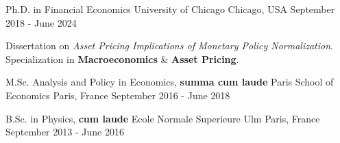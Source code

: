 

\begin{cventries}

	\cventry
	{Ph.D. in Financial Economics} %
	{University of Chicago} %
	{Chicago, USA} %
	{September 2018 - June 2024} %
	{\begin{cvitems}
			\item Dissertation on \textit{Asset Pricing Implications of Monetary Policy Normalization}. Specialization in \textbf{Macroeconomics} \& \textbf{Asset Pricing}.
		\end{cvitems}}

	\cventry
	{M.Sc. Analysis and Policy in Economics, \textbf{summa cum laude}} %
	{Paris School of Economics} %
	{Paris, France} %
	{September 2016 - June 2018} %
	{}

	\cventry
	{B.Sc. in Physics, \textbf{cum laude}} %
	{Ecole Normale Superieure Ulm} %
	{Paris, France} %
	{September 2013 - June 2016} %
	{}

\end{cventries}
